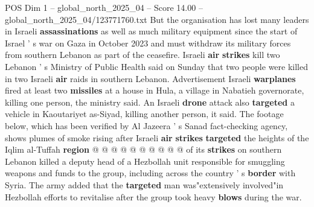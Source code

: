 \begin{textsample}{POS Dim 1 – global\_north\_2025\_04 – Score 14.00 – global\_north\_2025\_04/123771760.txt}
But the organisation has lost many leaders in Israeli \textbf{assassinations} as well as much military equipment since the start of Israel ' s war on Gaza in October 2023 and must withdraw its military forces from southern Lebanon as part of the ceasefire.
Israeli \textbf{air} \textbf{strikes} kill two Lebanon ' s Ministry of Public Health said on Sunday that two people were killed in two Israeli \textbf{air} raids in southern Lebanon.
Advertisement Israeli \textbf{warplanes} fired at least two \textbf{missiles} at a house in Hula, a village in Nabatieh governorate, killing one person, the ministry said.
An Israeli \textbf{drone} attack also \textbf{targeted} a vehicle in Kaoutariyet as-Siyad, killing another person, it said.
The footage below, which has been verified by Al Jazeera ' s Sanad fact-checking agency, shows plumes of smoke rising after Israeli \textbf{air} \textbf{strikes} \textbf{targeted} the heights of the Iqlim al-Tuffah \textbf{region} @ @ @ @ @ @ @ @ @ @ of its \textbf{strikes} on southern Lebanon killed a deputy head of a Hezbollah unit responsible for smuggling weapons and funds to the group, including across the country ' s \textbf{border} with Syria.
The army added that the \textbf{targeted} man was"extensively involved"in Hezbollah efforts to revitalise after the group took heavy \textbf{blows} during the war.

\end{textsample}
